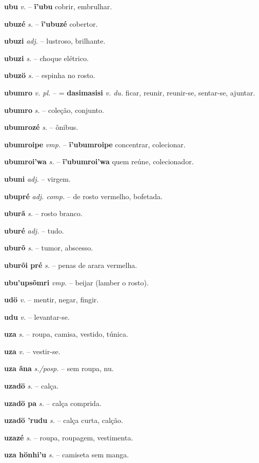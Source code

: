 \textbf{ubu} \textit{v.} -- \textbf{ĩ'ubu} cobrir, embrulhar.

\textbf{ubuzé} \textit{s.} -- \textbf{ĩ'ubuzé} cobertor.

\textbf{ubuzi} \textit{adj.} -- lustroso, brilhante.

\textbf{ubuzi} \textit{s.} -- choque elétrico.

\textbf{ubuzö} \textit{s.} -- espinha no rosto.

\textbf{ubumro} \textit{v. pl.} -- = \textbf{dasimasisi} \textit{v. du.} ficar, reunir, reunir-se, sentar-se, ajuntar.

\textbf{ubumro} \textit{s.} -- coleção, conjunto.

\textbf{ubumrozé} \textit{s.} -- ônibus.

\textbf{ubumroipe} \textit{vmp.} -- \textbf{ĩ'ubumroipe} concentrar, colecionar.

\textbf{ubumroi'wa} \textit{s.} -- \textbf{ĩ'ubumroi'wa} quem reúne, colecionador.

\textbf{ubuni} \textit{adj.} -- virgem.

\textbf{ubupré} \textit{adj. comp.} -- de rosto vermelho, bofetada.

\textbf{uburã} \textit{s.} -- rosto branco.

\textbf{uburé} \textit{adj.} -- tudo.

\textbf{uburõ} \textit{s.} -- tumor, abscesso.

\textbf{uburõi pré} \textit{s.} -- penas de arara vermelha.

\textbf{ubu'upsõmri} \textit{vmp.} -- beijar (lamber o rosto).

\textbf{udö} \textit{v.} -- mentir, negar, fingir.

\textbf{udu} \textit{v.} -- levantar-se.

\textbf{uza} \textit{s.} -- roupa, camisa, vestido, túnica.

\textbf{uza} \textit{v.} -- vestir-se.

\textbf{uza ãna} \textit{s./posp.} -- sem roupa, nu.

\textbf{uzadö} \textit{s.} -- calça.

\textbf{uzadö pa} \textit{s.} -- calça comprida.

\textbf{uzadö 'rudu} \textit{s.} -- calça curta, calção.

\textbf{uzazé} \textit{s.} -- roupa, roupagem, vestimenta.

\textbf{uza hönhi'u} \textit{s.} -- camiseta sem manga.

